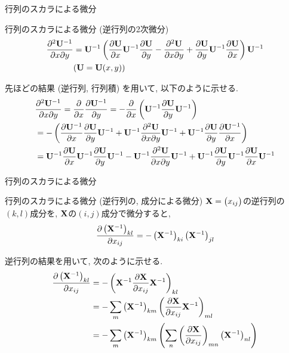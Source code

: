 \documentclass[dvipdfmx,notheorems,t]{beamer}
\begin{document}
\begin{frame}{行列のスカラによる微分}
\begin{block}{行列のスカラによる微分 (逆行列の2次微分)}
  \begin{align*}    
    \pdv{\vb{U}^{-1}}{x}{y} &= \vb{U}^{-1} \left(
      \pdv{\vb{U}}{x} \vb{U}^{-1} \pdv{\vb{U}}{y} - \pdv{\vb{U}}{x}{y}
      + \pdv{\vb{U}}{y} \vb{U}^{-1} \pdv{\vb{U}}{x} \right) \vb{U}^{-1} \\
      & \text{($\vb{U} = \vb{U}(x, y)$)}
  \end{align*}
\end{block}

先ほどの結果 (逆行列, 行列積) を用いて, 以下のように示せる.
{\small \begin{align*}
  & \pdv{\vb{U}^{-1}}{x}{y} = \pdv{x} \pdv{\vb{U}^{-1}}{y}
    = -\pdv{x} \left( \vb{U}^{-1} \pdv{\vb{U}}{y} \vb{U}^{-1} \right) \\
    &= - \left( \pdv{\vb{U}^{-1}}{x} \pdv{\vb{U}}{y} \vb{U}^{-1}
      + \vb{U}^{-1} \pdv{\vb{U}}{x}{y} \vb{U}^{-1}
      + \vb{U}^{-1} \pdv{\vb{U}}{y} \pdv{\vb{U}^{-1}}{x} \right) \\
    &= \vb{U}^{-1} \pdv{\vb{U}}{x} \vb{U}^{-1} \pdv{\vb{U}}{y} \vb{U}^{-1}
      - \vb{U}^{-1} \pdv{\vb{U}}{x}{y} \vb{U}^{-1}
      + \vb{U}^{-1} \pdv{\vb{U}}{y} \vb{U}^{-1} \pdv{\vb{U}}{x} \vb{U}^{-1}
\end{align*}}
\end{frame}

\begin{frame}{行列のスカラによる微分}
\begin{block}{行列のスカラによる微分 (逆行列の, 成分による微分)}
  $\vb{X} = \mqty(x_{ij})$の逆行列の$(k, l)$成分を, $\vb{X}$の$(i, j)$成分で微分すると,
  \begin{align*}
    \pdv{\left( \vb{X}^{-1} \right)_{kl}}{x_{ij}}
      = -\left( \vb{X}^{-1} \right)_{ki} \left( \vb{X}^{-1} \right)_{jl}
  \end{align*}
\end{block}

逆行列の結果を用いて, 次のように示せる.
\begin{align*}
  \pdv{\left( \vb{X}^{-1} \right)_{kl}}{x_{ij}}
    &= -\left( \vb{X}^{-1} \pdv{\vb{X}}{x_{ij}} \vb{X}^{-1} \right)_{kl} \\
    &= -\sum_m \left( \vb{X}^{-1} \right)_{km}
      \left( \pdv{\vb{X}}{x_{ij}} \vb{X}^{-1} \right)_{ml} \\
    &= -\sum_m \left( \vb{X}^{-1} \right)_{km}
      \left( \sum_n \left( \pdv{\vb{X}}{x_{ij}} \right)_{mn} \left( \vb{X}^{-1} \right)_{nl} \right)
\end{align*}
\end{frame}
\end{document}
